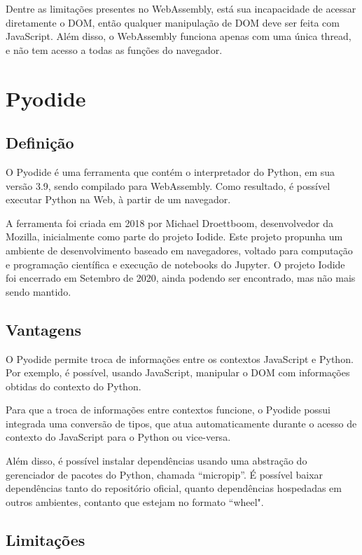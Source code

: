 Dentre as limitações presentes no WebAssembly, está sua incapacidade de acessar diretamente o DOM, então qualquer manipulação de DOM deve ser feita com JavaScript. Além disso, o WebAssembly funciona apenas com uma única thread, e não tem acesso a todas as funções do navegador.


\section{Pyodide}

\subsection{Definição}

O Pyodide é uma ferramenta que contém o interpretador do Python, em sua versão 3.9, sendo compilado para WebAssembly. Como resultado, é possível executar Python na Web, à partir de um navegador.

A ferramenta foi criada em 2018 por Michael Droettboom, desenvolvedor da Mozilla, inicialmente como parte do projeto Iodide. Este projeto propunha um ambiente de desenvolvimento baseado em navegadores, voltado para computação e programação científica e execução de notebooks do Jupyter. O projeto Iodide foi encerrado em Setembro de 2020, ainda podendo ser encontrado, mas não mais sendo mantido.

\subsection{Vantagens}

O Pyodide permite troca de informações entre os contextos JavaScript e Python. Por exemplo, é possível, usando JavaScript, manipular o DOM com informações obtidas do contexto do Python.

Para que a troca de informações entre contextos funcione, o Pyodide possui integrada uma conversão de tipos, que atua automaticamente durante o acesso de contexto do JavaScript para o Python ou vice-versa.

Além disso, é possível instalar dependências usando uma abstração do gerenciador de pacotes do Python, chamada “micropip”. É possível baixar dependências tanto do repositório oficial, quanto dependências hospedadas em outros ambientes, contanto que estejam no formato “wheel".

\subsection{Limitações}

